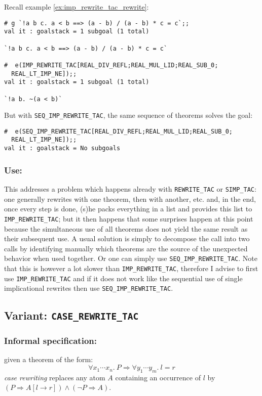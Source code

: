 \documentclass{llncs}
\newcommand*\IMPREWRITETAC{\texttt{IMP\_REWRITE\_TAC}\xspace}
\newcommand*\SEQIMPREWRITETAC{\texttt{SEQ\_IMP\_REWRITE\_TAC}\xspace}
\newcommand*\REWRITETAC{\texttt{REWRITE\_TAC}\xspace}
\newcommand*\SIMPTAC{\texttt{SIMP\_TAC}\xspace}
\newcommand*\CASETAC{\texttt{CASE\_REWRITE\_TAC}\xspace}
\begin{document}
    \begin{example}
      Recall example \ref{ex:imp_rewrite_tac_rewrite}:
        \begin{verbatim}
# g `!a b c. a < b ==> (a - b) / (a - b) * c = c`;;
val it : goalstack = 1 subgoal (1 total)

`!a b c. a < b ==> (a - b) / (a - b) * c = c`

#  e(IMP_REWRITE_TAC[REAL_DIV_REFL;REAL_MUL_LID;REAL_SUB_0;
  REAL_LT_IMP_NE]);;
val it : goalstack = 1 subgoal (1 total)

`!a b. ~(a < b)` \end{verbatim}
        But with \SEQIMPREWRITETAC, the same sequence of theorems solves the goal:
        \begin{verbatim}
#  e(SEQ_IMP_REWRITE_TAC[REAL_DIV_REFL;REAL_MUL_LID;REAL_SUB_0;
  REAL_LT_IMP_NE]);;
val it : goalstack = No subgoals \end{verbatim}
      \end{example}

    \subsubsection{Use:}
    This addresses a problem which happens already with \REWRITETAC or \SIMPTAC:
    one generally rewrites with one theorem, then with another, etc.
    and, in the end, once every step is done, (s)he packs everything in a list and provides this list
    to \IMPREWRITETAC; but it then happens that some surprises happen at this point
    because the simultaneous use of all theorems does not yield the same result as their subsequent use.
    A usual solution is simply to decompose the call into two calls by identifying manually
    which theorems are the source of the unexpected behavior when used together.
    Or one can simply use \SEQIMPREWRITETAC.
    Note that this is however a lot slower than \IMPREWRITETAC,
    therefore I advise to first use \IMPREWRITETAC and if it does not work like the sequential use of
    single implicational rewrites then use \SEQIMPREWRITETAC.

  \subsection{Variant: \CASETAC}
		\subsubsection{Informal specification:}
		given a theorem of the form:
    \[\forall x_1\cdots x_n.\ P \Rightarrow \forall y_1\cdots y_m.\ l = r\]
    \emph{case rewriting} replaces any atom $A$ containing an occurrence of $l$
    by $(P \Rightarrow A[l\to r]) \wedge (\neg P \Rightarrow A)$.
\end{document}
